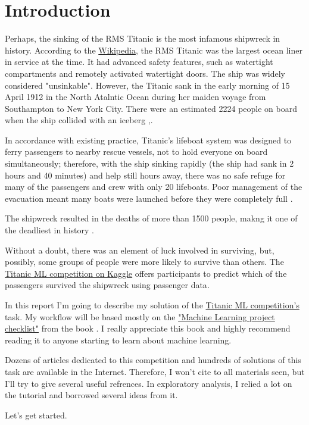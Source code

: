 \chapter{Introduction}
Perhaps, the sinking of the RMS Titanic is the most infamous shipwreck 
in history. According to the 
\href{https://en.wikipedia.org/wiki/Titanic}{Wikipedia}, 
the RMS Titanic was the largest ocean liner in service at the time. It
had advanced safety features, such as watertight compartments and 
remotely activated watertight doors. The ship was widely considered 
"unsinkable". However, the Titanic sank in the early morning of 15 April
1912 in the North Atalntic Ocean during her maiden voyage from 
Southampton to New York City. There were an estimated 2224 people on
board when the ship collided with an iceberg
\cite{titanic-wikipedia},\cite{sinking-of-the-titanic-wikipedia}.

In accordance with existing practice, Titanic's lifeboat system was 
designed to ferry passengers to nearby rescue vessels, not to hold 
everyone on board simultaneously; therefore, with the ship sinking 
rapidly (the ship had sank in 2 hours and 40 minutes) and help still 
hours away, there was no safe refuge for many of the passengers and 
crew with only 20 lifeboats. Poor management of the evacuation meant 
many boats were launched before they were completely full 
\cite{sinking-of-the-titanic-wikipedia}.

The shipwreck resulted in the deaths of more than 1500 people, makng it 
one of the deadliest in history \cite{sinking-of-the-titanic-wikipedia}.

Without a doubt, there was an element of luck involved in surviving, but,
possibly, some groups of people were more likely to survive than others.
The \href{https://www.kaggle.com/c/titanic}{Titanic ML competition on 
Kaggle} offers participants to predict which of the passengers survived 
the shipwreck using passenger data\cite{titanic-ml-competition}.

In this report I'm going to describe my solution of the
\href{https://www.kaggle.com/c/titanic}{Titanic ML competition's} task.
My workflow will be based mostly on the
\href{https://github.com/ageron/handson-ml/blob/master/ml-project-checklist.md}
{"Machine Learning project checklist"} from the book \cite{hands_on_ml}.
I really appreciate this book and highly recommend reading it to anyone 
starting to learn about machine learning. 

Dozens of articles dedicated to this competition and hundreds of solutions 
of this task are available in the Internet. Therefore, I won't cite to 
all materials seen, but I'll try to give several useful refrences.
In exploratory analysis, I relied a lot on the tutorial \cite{habr_titanic} 
and borrowed several ideas from it.

Let's get started.